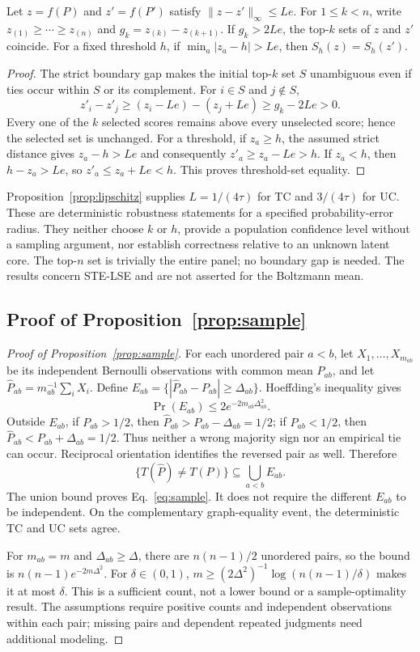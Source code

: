 \begin{proposition}\label{prop:selection-stability}
Let $z=f(P)$ and $z'=f(P')$ satisfy $\|z-z'\|_\infty\le Le$. For $1\le k<n$, write $z_{(1)}\ge\cdots\ge z_{(n)}$ and $g_k=z_{(k)}-z_{(k+1)}$. If $g_k>2Le$, the top-$k$ sets of $z$ and $z'$ coincide. For a fixed threshold $h$, if $\min_a|z_a-h|>Le$, then $S_h(z)=S_h(z')$.
\end{proposition}
\begin{proof}
The strict boundary gap makes the initial top-$k$ set $S$ unambiguous even if ties occur within $S$ or its complement. For $i\in S$ and $j\notin S$,
\[
z'_i-z'_j\ge(z_i-Le)-(z_j+Le)\ge g_k-2Le>0.
\]
Every one of the $k$ selected scores remains above every unselected score; hence the selected set is unchanged. For a threshold, if $z_a\ge h$, the assumed strict distance gives $z_a-h>Le$ and consequently $z'_a\ge z_a-Le>h$. If $z_a<h$, then $h-z_a>Le$, so $z'_a\le z_a+Le<h$. This proves threshold-set equality.
\end{proof}
Proposition~\ref{prop:lipschitz} supplies $L=1/(4\tau)$ for TC and $3/(4\tau)$ for UC. These are deterministic robustness statements for a specified probability-error radius. They neither choose $k$ or $h$, provide a population confidence level without a sampling argument, nor establish correctness relative to an unknown latent core. The top-$n$ set is trivially the entire panel; no boundary gap is needed. The results concern STE-LSE and are not asserted for the Boltzmann mean.

\subsection{Proof of Proposition~\ref{prop:sample}}
\begin{proof}[Proof of Proposition~\ref{prop:sample}]
For each unordered pair $a<b$, let $X_1,\ldots,X_{m_{ab}}$ be its independent Bernoulli observations with common mean $P_{ab}$, and let $\widehat P_{ab}=m_{ab}^{-1}\sum_iX_i$. Define
$E_{ab}=\{|\widehat P_{ab}-P_{ab}|\ge\Delta_{ab}\}$.
Hoeffding's inequality \citep{hoeffding1963probability} gives
\[
\Pr(E_{ab})\le2e^{-2m_{ab}\Delta_{ab}^2}.
\]
Outside $E_{ab}$, if $P_{ab}>1/2$, then $\widehat P_{ab}>P_{ab}-\Delta_{ab}=1/2$; if $P_{ab}<1/2$, then $\widehat P_{ab}<P_{ab}+\Delta_{ab}=1/2$. Thus neither a wrong majority sign nor an empirical tie can occur. Reciprocal orientation identifies the reversed pair as well. Therefore
\[
\{T(\widehat P)\ne T(P)\}\subseteq\bigcup_{a<b}E_{ab}.
\]
The union bound proves Eq.~\eqref{eq:sample}. It does not require the different $E_{ab}$ to be independent. On the complementary graph-equality event, the deterministic TC and UC sets agree.

For $m_{ab}=m$ and $\Delta_{ab}\ge\Delta$, there are $n(n-1)/2$ unordered pairs, so the bound is $n(n-1)e^{-2m\Delta^2}$. For $\delta\in(0,1)$, $m\ge(2\Delta^2)^{-1}\log(n(n-1)/\delta)$ makes it at most $\delta$. This is a sufficient count, not a lower bound or a sample-optimality result. The assumptions require positive counts and independent observations within each pair; missing pairs and dependent repeated judgments need additional modeling.
\end{proof}

